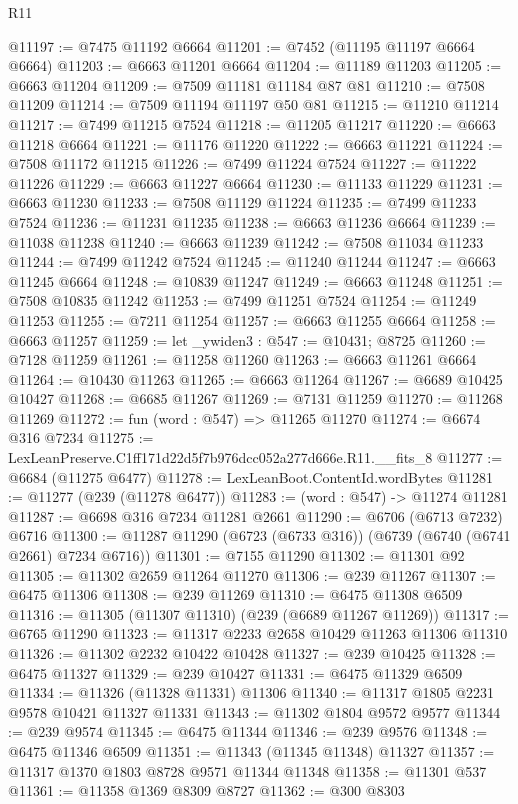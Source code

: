 \begin{lexlean}{R11}
\begin{coremodule}
@11197 := @7475 @11192 @6664
@11201 := @7452 (@11195 @11197 @6664 @6664)
@11203 := @6663 @11201 @6664
@11204 := @11189 @11203
@11205 := @6663 @11204
@11209 := @7509 @11181 @11184 @87 @81
@11210 := @7508 @11209
@11214 := @7509 @11194 @11197 @50 @81
@11215 := @11210 @11214
@11217 := @7499 @11215 @7524
@11218 := @11205 @11217
@11220 := @6663 @11218 @6664
@11221 := @11176 @11220
@11222 := @6663 @11221
@11224 := @7508 @11172 @11215
@11226 := @7499 @11224 @7524
@11227 := @11222 @11226
@11229 := @6663 @11227 @6664
@11230 := @11133 @11229
@11231 := @6663 @11230
@11233 := @7508 @11129 @11224
@11235 := @7499 @11233 @7524
@11236 := @11231 @11235
@11238 := @6663 @11236 @6664
@11239 := @11038 @11238
@11240 := @6663 @11239
@11242 := @7508 @11034 @11233
@11244 := @7499 @11242 @7524
@11245 := @11240 @11244
@11247 := @6663 @11245 @6664
@11248 := @10839 @11247
@11249 := @6663 @11248
@11251 := @7508 @10835 @11242
@11253 := @7499 @11251 @7524
@11254 := @11249 @11253
@11255 := @7211 @11254
@11257 := @6663 @11255 @6664
@11258 := @6663 @11257
@11259 := let _ywiden3 : @547 := @10431; @8725
@11260 := @7128 @11259
@11261 := @11258 @11260
@11263 := @6663 @11261 @6664
@11264 := @10430 @11263
@11265 := @6663 @11264
@11267 := @6689 @10425 @10427
@11268 := @6685 @11267
@11269 := @7131 @11259
@11270 := @11268 @11269
@11272 := fun (word : @547) => @11265 @11270
@11274 := @6674 @316 @7234
@11275 := LexLeanPreserve.C1ff171d22d5f7b976dcc052a277d666e.R11.__fits_8
@11277 := @6684 (@11275 @6477)
@11278 := LexLeanBoot.ContentId.wordBytes
@11281 := @11277 (@239 (@11278 @6477))
@11283 := (word : @547) -> @11274 @11281
@11287 := @6698 @316 @7234 @11281 @2661
@11290 := @6706 (@6713 @7232) @6716
@11300 := @11287 @11290 (@6723 (@6733 @316)) (@6739 (@6740 (@6741 @2661) @7234 @6716))
@11301 := @7155 @11290
@11302 := @11301 @92
@11305 := @11302 @2659 @11264 @11270
@11306 := @239 @11267
@11307 := @6475 @11306
@11308 := @239 @11269
@11310 := @6475 @11308 @6509
@11316 := @11305 (@11307 @11310) (@239 (@6689 @11267 @11269))
@11317 := @6765 @11290
@11323 := @11317 @2233 @2658 @10429 @11263 @11306 @11310
@11326 := @11302 @2232 @10422 @10428
@11327 := @239 @10425
@11328 := @6475 @11327
@11329 := @239 @10427
@11331 := @6475 @11329 @6509
@11334 := @11326 (@11328 @11331) @11306
@11340 := @11317 @1805 @2231 @9578 @10421 @11327 @11331
@11343 := @11302 @1804 @9572 @9577
@11344 := @239 @9574
@11345 := @6475 @11344
@11346 := @239 @9576
@11348 := @6475 @11346 @6509
@11351 := @11343 (@11345 @11348) @11327
@11357 := @11317 @1370 @1803 @8728 @9571 @11344 @11348
@11358 := @11301 @537
@11361 := @11358 @1369 @8309 @8727
@11362 := @300 @8303

\end{coremodule}
\end{lexlean}
